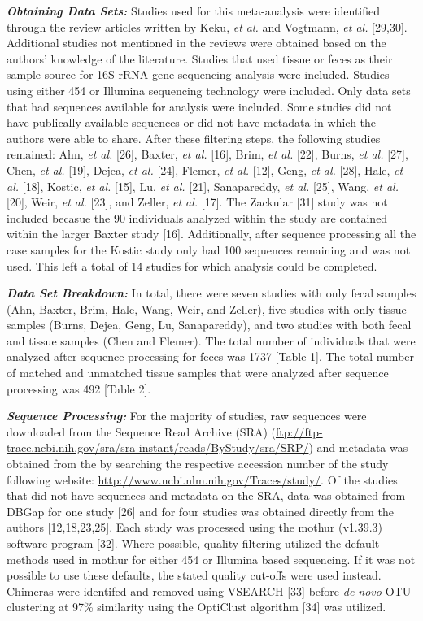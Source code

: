 \documentclass[12pt,]{article}
\begin{document}
\textbf{\emph{Obtaining Data Sets:}} Studies used for this meta-analysis
were identified through the review articles written by Keku, \emph{et
al.} and Vogtmann, \emph{et al.} {[}29,30{]}. Additional studies not
mentioned in the reviews were obtained based on the authors' knowledge
of the literature. Studies that used tissue or feces as their sample
source for 16S rRNA gene sequencing analysis were included. Studies
using either 454 or Illumina sequencing technology were included. Only
data sets that had sequences available for analysis were included. Some
studies did not have publically available sequences or did not have
metadata in which the authors were able to share. After these filtering
steps, the following studies remained: Ahn, \emph{et al.} {[}26{]},
Baxter, \emph{et al.} {[}16{]}, Brim, \emph{et al.} {[}22{]}, Burns,
\emph{et al.} {[}27{]}, Chen, \emph{et al.} {[}19{]}, Dejea, \emph{et
al.} {[}24{]}, Flemer, \emph{et al.} {[}12{]}, Geng, \emph{et al.}
{[}28{]}, Hale, \emph{et al.} {[}18{]}, Kostic, \emph{et al.} {[}15{]},
Lu, \emph{et al.} {[}21{]}, Sanapareddy, \emph{et al.} {[}25{]}, Wang,
\emph{et al.} {[}20{]}, Weir, \emph{et al.} {[}23{]}, and Zeller,
\emph{et al.} {[}17{]}. The Zackular {[}31{]} study was not included
becasue the 90 individuals analyzed within the study are contained
within the larger Baxter study {[}16{]}. Additionally, after sequence
processing all the case samples for the Kostic study only had 100
sequences remaining and was not used. This left a total of 14 studies
for which analysis could be completed.

\textbf{\emph{Data Set Breakdown:}} In total, there were seven studies
with only fecal samples (Ahn, Baxter, Brim, Hale, Wang, Weir, and
Zeller), five studies with only tissue samples (Burns, Dejea, Geng, Lu,
Sanapareddy), and two studies with both fecal and tissue samples (Chen
and Flemer). The total number of individuals that were analyzed after
sequence processing for feces was 1737 {[}Table 1{]}. The total number
of matched and unmatched tissue samples that were analyzed after
sequence processing was 492 {[}Table 2{]}.

\textbf{\emph{Sequence Processing:}} For the majority of studies, raw
sequences were downloaded from the Sequence Read Archive (SRA)
(\url{ftp://ftp-trace.ncbi.nih.gov/sra/sra-instant/reads/ByStudy/sra/SRP/})
and metadata was obtained from the by searching the respective accession
number of the study following website:
\url{http://www.ncbi.nlm.nih.gov/Traces/study/}. Of the studies that did
not have sequences and metadata on the SRA, data was obtained from DBGap
for one study {[}26{]} and for four studies was obtained directly from
the authors {[}12,18,23,25{]}. Each study was processed using the mothur
(v1.39.3) software program {[}32{]}. Where possible, quality filtering
utilized the default methods used in mothur for either 454 or Illumina
based sequencing. If it was not possible to use these defaults, the
stated quality cut-offs were used instead. Chimeras were identifed and
removed using VSEARCH {[}33{]} before \emph{de novo} OTU clustering at
97\% similarity using the OptiClust algorithm {[}34{]} was utilized.
\end{document}
